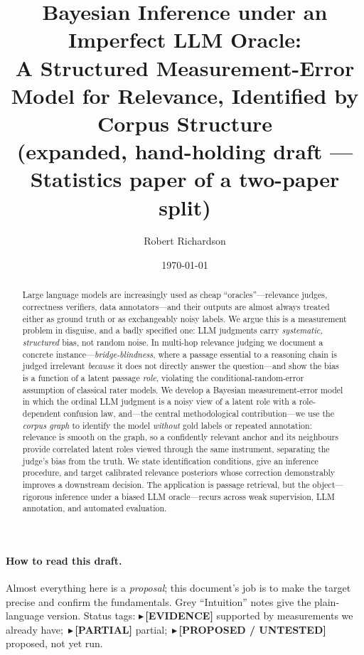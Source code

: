 \documentclass[11pt]{article}
\title{\textbf{Bayesian Inference under an Imperfect LLM Oracle:\\ A Structured Measurement-Error Model for
Relevance, Identified by Corpus Structure}\\[4pt]
\large\normalfont(expanded, hand-holding draft --- Statistics paper of a two-paper split)}
\author{Robert Richardson}
\date{\today}
\newcommand{\TESTED}[1]{{\color{teal}\small$\blacktriangleright$\,\textbf{[EVIDENCE]} #1}}
\newcommand{\PARTIAL}[1]{{\color{orange}\small$\blacktriangleright$\,\textbf{[PARTIAL]} #1}}
\newcommand{\PROP}[1]{{\color{violet}\small$\blacktriangleright$\,\textbf{[PROPOSED / UNTESTED]} #1}}
\begin{document}
\maketitle

\begin{abstract}
Large language models are increasingly used as cheap ``oracles''---relevance judges, correctness verifiers,
data annotators---and their outputs are almost always treated either as ground truth or as exchangeably noisy
labels. We argue this is a measurement problem in disguise, and a badly specified one: LLM judgments carry
\emph{systematic, structured} bias, not random noise. In multi-hop relevance judging we document a concrete
instance---\emph{bridge-blindness}, where a passage essential to a reasoning chain is judged irrelevant
\emph{because} it does not directly answer the question---and show the bias is a function of a latent passage
\emph{role}, violating the conditional-random-error assumption of classical rater models. We develop a Bayesian
measurement-error model in which the ordinal LLM judgment is a noisy view of a latent role with a role-dependent
confusion law, and---the central methodological contribution---we use the \emph{corpus graph} to identify the
model \emph{without} gold labels or repeated annotation: relevance is smooth on the graph, so a confidently
relevant anchor and its neighbours provide correlated latent roles viewed through the same instrument,
separating the judge's bias from the truth. We state identification conditions, give an inference procedure,
and target calibrated relevance posteriors whose correction demonstrably improves a downstream decision. The
application is passage retrieval, but the object---rigorous inference under a biased LLM oracle---recurs across
weak supervision, LLM annotation, and automated evaluation.
\end{abstract}

\paragraph{How to read this draft.} Almost everything here is a \emph{proposal}; this document's job is to make
the target precise and confirm the fundamentals. Grey ``Intuition'' notes give the plain-language version.
Status tags: \TESTED{} supported by measurements we already have;\ \PARTIAL{} partial;\ \PROP{} proposed, not
yet run.
\end{document}
